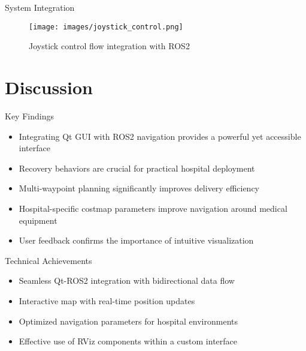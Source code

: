 \documentclass[aspectratio=169]{beamer}
\begin{document}
\begin{frame}{System Integration}
	\begin{figure}
		\centering
		\texttt{[image: images/joystick\_control.png]}
		\caption{Joystick control flow integration with ROS2}
	\end{figure}
\end{frame}

\section{Discussion}

\begin{frame}{Key Findings}
	\begin{itemize}
		\item Integrating Qt GUI with ROS2 navigation provides a powerful yet accessible interface
		\item Recovery behaviors are crucial for practical hospital deployment
		\item Multi-waypoint planning significantly improves delivery efficiency
		\item Hospital-specific costmap parameters improve navigation around medical equipment
		\item User feedback confirms the importance of intuitive visualization
	\end{itemize}

	\begin{block}{Technical Achievements}
		\begin{itemize}
			\item Seamless Qt-ROS2 integration with bidirectional data flow
			\item Interactive map with real-time position updates
			\item Optimized navigation parameters for hospital environments
			\item Effective use of RViz components within a custom interface
		\end{itemize}
	\end{block}
\end{frame}
\end{document}
